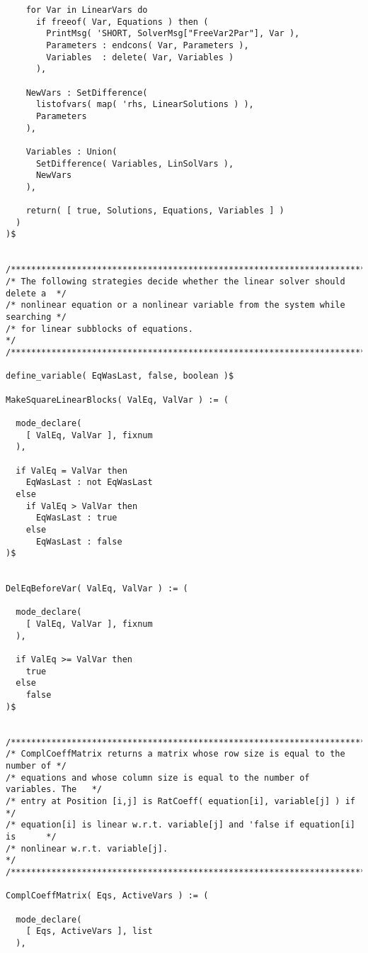 \begin{verbatim}
    for Var in LinearVars do
      if freeof( Var, Equations ) then (
        PrintMsg( 'SHORT, SolverMsg["FreeVar2Par"], Var ),
        Parameters : endcons( Var, Parameters ),
        Variables  : delete( Var, Variables )
      ),

    NewVars : SetDifference(
      listofvars( map( 'rhs, LinearSolutions ) ),
      Parameters
    ),

    Variables : Union(
      SetDifference( Variables, LinSolVars ),
      NewVars
    ),

    return( [ true, Solutions, Equations, Variables ] )
  )
)$


/******************************************************************************/
/* The following strategies decide whether the linear solver should delete a  */
/* nonlinear equation or a nonlinear variable from the system while searching */
/* for linear subblocks of equations.                                         */
/******************************************************************************/

define_variable( EqWasLast, false, boolean )$

MakeSquareLinearBlocks( ValEq, ValVar ) := (

  mode_declare(
    [ ValEq, ValVar ], fixnum
  ),

  if ValEq = ValVar then
    EqWasLast : not EqWasLast
  else
    if ValEq > ValVar then
      EqWasLast : true
    else
      EqWasLast : false
)$


DelEqBeforeVar( ValEq, ValVar ) := (

  mode_declare(
    [ ValEq, ValVar ], fixnum
  ),

  if ValEq >= ValVar then
    true
  else
    false
)$


/******************************************************************************/
/* ComplCoeffMatrix returns a matrix whose row size is equal to the number of */
/* equations and whose column size is equal to the number of variables. The   */
/* entry at Position [i,j] is RatCoeff( equation[i], variable[j] ) if         */
/* equation[i] is linear w.r.t. variable[j] and 'false if equation[i] is      */
/* nonlinear w.r.t. variable[j].                                              */
/******************************************************************************/

ComplCoeffMatrix( Eqs, ActiveVars ) := (

  mode_declare(
    [ Eqs, ActiveVars ], list
  ),


\end{verbatim}
